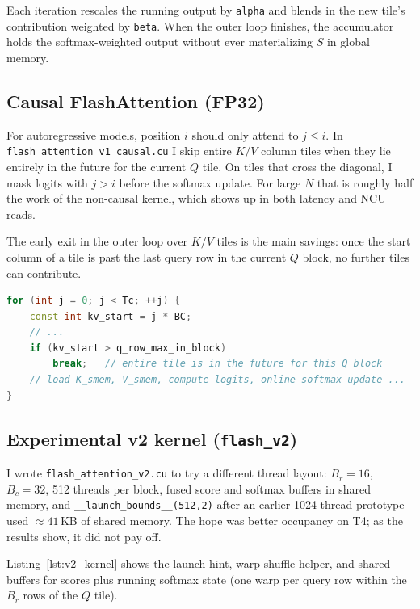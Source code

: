 \documentclass[12pt]{article}
\begin{document}
\noindent Each iteration rescales the running output by \texttt{alpha} and blends in the new tile's contribution weighted by \texttt{beta}. When the outer loop finishes, the accumulator holds the softmax-weighted output without ever materializing $S$ in global memory.

\subsection{Causal FlashAttention (FP32)}

For autoregressive models, position $i$ should only attend to $j \leq i$. In \texttt{flash\_attention\_v1\_causal.cu} I skip entire $K/V$ column tiles when they lie entirely in the future for the current $Q$ tile. On tiles that cross the diagonal, I mask logits with $j > i$ before the softmax update. For large $N$ that is roughly half the work of the non-causal kernel, which shows up in both latency and NCU reads.

\noindent The early exit in the outer loop over $K/V$ tiles is the main savings: once the start column of a tile is past the last query row in the current $Q$ block, no further tiles can contribute.

\begin{lstlisting}[language=C++, basicstyle=\ttfamily\footnotesize, frame=single,
  caption={Skipping future-only $K/V$ tiles (causal Flash, excerpt).},
  label=lst:causal_skip, commentstyle=\color{green!60!black}]
for (int j = 0; j < Tc; ++j) {
    const int kv_start = j * BC;
    // ...
    if (kv_start > q_row_max_in_block)
        break;   // entire tile is in the future for this Q block
    // load K_smem, V_smem, compute logits, online softmax update ...
}
\end{lstlisting}

\subsection{Experimental v2 kernel (\texttt{flash\_v2})}
\label{sec:flashv2}

I wrote \texttt{flash\_attention\_v2.cu} to try a different thread layout: $B_r = 16$, $B_c = 32$, 512 threads per block, fused score and softmax buffers in shared memory, and \texttt{\_\_launch\_bounds\_\_(512,2)} after an earlier 1024-thread prototype used $\approx 41$\,KB of shared memory. The hope was better occupancy on T4; as the results show, it did not pay off.

\noindent Listing~\ref{lst:v2_kernel} shows the launch hint, warp shuffle helper, and shared buffers for scores plus running softmax state (one warp per query row within the $B_r$ rows of the $Q$ tile).
\end{document}
